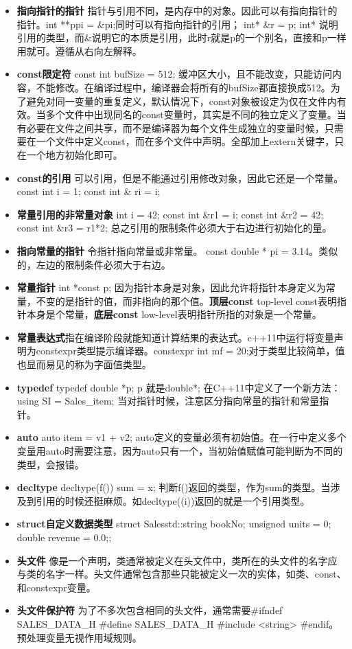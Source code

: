 \begin{itemize}
	\item \textbf{指向指针的指针} 指针与引用不同，是内存中的对象。因此可以有指向指针的指针。int **ppi = \&pi;同时可以有指向指针的引用； int* \&r = p; int* 说明引用的类型，而\&说明它的本质是引用，此时r就是p的一个别名，直接和p一样用就可。遵循从右向左解释。
	\item \textbf{const限定符} const int bufSize = 512; 缓冲区大小，且不能改变，只能访问内容，不能修改。在编译过程中，编译器会将所有的bufSize都直接换成512。为了避免对同一变量的重复定义，默认情况下，const对象被设定为仅在文件内有效。当多个文件中出现同名的const变量时，其实是不同的独立定义了变量。当有必要在文件之间共享，而不是编译器为每个文件生成独立的变量时候，只需要在一个文件中定义const，而在多个文件中声明。全部加上extern关键字，只在一个地方初始化即可。
	\item \textbf{const的引用} 可以引用，但是不能通过引用修改对象，因此它还是一个常量。const int i = 1; const int \& ri = i;
	\item \textbf{常量引用的非常量对象} int i = 42; const int \&r1 = i; const int \&r2 = 42; const int \&r3 = r1*2; 总之引用的限制条件必须大于右边进行初始化的量。
	\item \textbf{指向常量的指针} 令指针指向常量或非常量。 const double * pi = 3.14。类似的，左边的限制条件必须大于右边。
	\item \textbf{常量指针} int *const p; 因为指针本身是对象，因此允许将指针本身定义为常量，不变的是指针的值，而非指向的那个值。\textbf{顶层const} top-level const表明指针本身是个常量，\textbf{底层const} low-level表明指针所指的对象是一个常量。
	\item \textbf{常量表达式}指在编译阶段就能知道计算结果的表达式。c++11中运行将变量声明为constexpr类型提示编译器。constexpr int mf = 20;对于类型比较简单，值也显而易见的称为字面值类型。
	\item \textbf{typedef} typedef double *p; p 就是double*; 在C++11中定义了一个新方法：using SI = Sales\_item; 当对指针时候，注意区分指向常量的指针和常量指针。
	\item \textbf{auto} auto item = v1 + v2; auto定义的变量必须有初始值。在一行中定义多个变量用auto时需要注意，因为auto只有一个，当初始值赋值可能判断为不同的类型，会报错。
	\item \textbf{decltype} decltype(f()) sum = x; 判断f()返回的类型，作为sum的类型。当涉及到引用的时候还挺麻烦。如decltype((i))返回的就是一个引用类型。
	\item \textbf{struct自定义数据类型} struct Sales{std::string bookNo; unsigned units = 0; double revenue = 0.0;};
	\item \textbf{头文件} 像是一个声明，类通常被定义在头文件中，类所在的头文件的名字应与类的名字一样。头文件通常包含那些只能被定义一次的实体，如类、const、和constexpr变量。
	\item \textbf{头文件保护符} 为了不多次包含相同的头文件，通常需要$\#$ifndef SALES\_DATA\_H $\#$define SALES\_DATA\_H $\#$include <string> $\#$endif。预处理变量无视作用域规则。	
\end{itemize}

